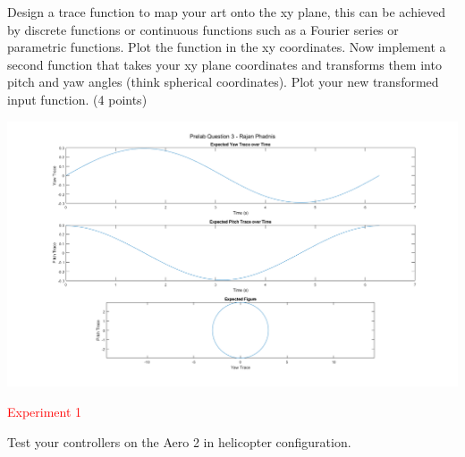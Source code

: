 \documentclass[11pt]{article}
\begin{document}
\newpage

\textcolor{blue}{}
\medskip

Design a trace function to map your art onto the xy plane, this can be achieved by discrete functions or continuous functions such as a Fourier series or parametric functions. Plot the function in the xy coordinates. Now implement a second function that takes your xy plane coordinates and transforms them into pitch and yaw angles (think spherical coordinates). Plot your new transformed input function.  (4 points)

\centering
  \includegraphics[width=6.5in]{prelab3.png}

\newpage

\noindent \textcolor{red}{{\huge  Experiment 1}}
\vspace{0.5 cm}

Test your controllers on the Aero 2 in helicopter configuration.
\vspace{0.5 cm}

\medskip
\end{document}
